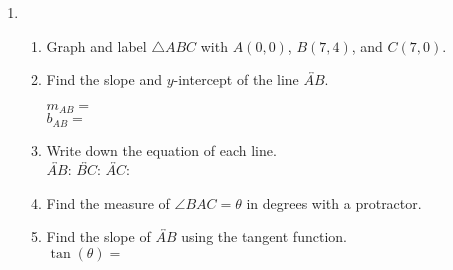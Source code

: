 \documentclass[12pt, twoside]{article}
\begin{document}
\begin{enumerate}
    \item \begin{enumerate}
      \item Graph and label $\triangle ABC$ with $A(0,0)$, $B(7,4)$, and $C(7,0)$.
      \begin{center}
      \end{center}
      \item Find the slope and $y$-intercept of the line $\overleftrightarrow{AB}$.
        \begin{multicols}{2}
          $m_{AB}=$ \\
          $b_{AB}=$
        \end{multicols} \vspace{0.5cm}
      \item Write down the equation of each line. \\[0.5cm]
        $\overleftrightarrow{AB}$: \hfill
        $\overleftrightarrow{BC}$: \hfill
        $\overleftrightarrow{AC}$: \hspace{2cm}
      \vspace{2cm}
      \item Find the measure of $\angle BAC=\theta$ in degrees with a protractor. \vspace{0.5cm}
      \item Find the slope of $\overleftrightarrow{AB}$ using the tangent function.\\[0.5cm]
      $\displaystyle \tan(\theta)=$
      \vspace{2cm}
    \end{enumerate}

\end{enumerate}
\end{document}
